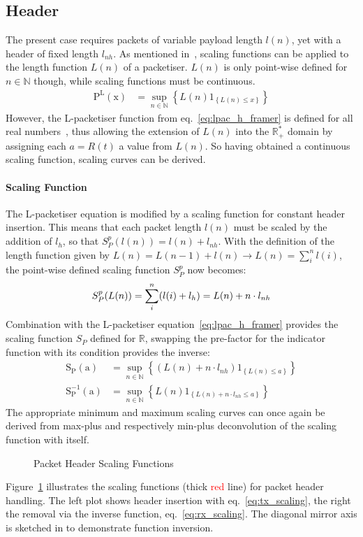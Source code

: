 \subsection{Header}
The present case requires packets of variable payload length $l(n)$, yet with a header of fixed length $l_{nh}$.
As mentioned in~\cite[p. 290 (4)]{fidler_way_2006}, scaling functions can be applied to the length function $L(n)$ of a packetiser.
$L(n)$ is only point-wise defined for $n \in \mathbb{N}$ though, while scaling functions must be continuous. 
%
\begin{align}
\mathrm{P^L(x)} &= \sup_{n \in \mathbb{N}}\left\{ L(n) 1_{\left\{L(n)\le x\right\}}\right\}
\label{eq:lpac_h_framer}
\end{align}
%
However, the L-packetiser function from eq.~\ref{eq:lpac_h_framer} is defined for all real numbers~\cite[p. 42]{thiran_network_2001},
thus allowing the extension of $L(n)$ into the $\mathbb{R^*_+}$ domain by assigning each $a = R(t)$ a value from $L(n)$.
So having obtained a continuous scaling function, scaling curves can be derived.
\paragraph{Scaling Function}
The L-packetiser equation is modified by a scaling function for constant header insertion.
This means that each packet length $l(n)$ must be scaled by the addition of $l_h$, so that  $S_P^p(l(n)) = l(n) + l_{nh}$.
With the definition of the length function given by $L(n) = L(n-1) + l(n) \to L(n) = \sum_{i}^n l(i)$,
the point-wise defined scaling function $S_P^p$ now becomes:
%
\begin{align}
S_P^p(L(n)) = \sum_{i}^n (l(i) + l_h) = L(n) + n \cdot l_{nh}\notag
\end{align}
%
Combination with the L-packetiser equation~\ref{eq:lpac_h_framer} provides the scaling function $S_P$ defined for $\mathbb{R}$,
swapping the pre-factor for the indicator function with its condition provides the inverse:
%
\begin{align}
\mathrm{S_P(a)}      &= \sup_{n \in \mathbb{N}} \left \{ (L(n) + n \cdot l_{nh} )1_{ \left \{ L(n)               \le a \right \} }\right \}\label{eq:tx_scaling}\\
\mathrm{S^{-1}_P(a)} &= \sup_{n \in \mathbb{N}} \left \{ L(n)               1_{ \left \{ L(n) + n \cdot l_{nh}  \le a \right \} }\right\}\label{eq:rx_scaling}
\end{align}
%
The appropriate minimum and maximum scaling curves can once again be derived from max-plus and respectively min-plus deconvolution of the scaling function with itself.
%
\begin{figure}[H]
  \centering
  \def\svgwidth{0.95\textwidth}
  
  \caption{Packet Header Scaling Functions}
  \label{fig:hdr_scaler}
\end{figure}
\noindent
Figure~\ref{fig:hdr_scaler} illustrates the scaling functions (thick \textcolor{Red}{red} line) for packet header handling. The left plot shows header insertion with eq.~\ref{eq:tx_scaling},
the right the removal via the inverse function, eq.~\ref{eq:rx_scaling}. The diagonal mirror axis is sketched in to demonstrate function inversion.

